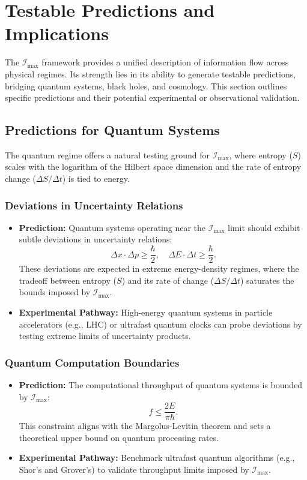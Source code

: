 \documentclass[12pt]{article}
\begin{document}
\section{Testable Predictions and Implications}
The \( \mathcal{I}_{\text{max}} \) framework provides a unified description of information flow across physical regimes. Its strength lies in its ability to generate testable predictions, bridging quantum systems, black holes, and cosmology. This section outlines specific predictions and their potential experimental or observational validation.

\subsection{Predictions for Quantum Systems}
The quantum regime offers a natural testing ground for \( \mathcal{I}_{\text{max}} \), where entropy (\( S \)) scales with the logarithm of the Hilbert space dimension and the rate of entropy change (\( \Delta S / \Delta t \)) is tied to energy.

\subsubsection{Deviations in Uncertainty Relations}
\begin{itemize}
    \item \textbf{Prediction:} Quantum systems operating near the \( \mathcal{I}_{\text{max}} \) limit should exhibit subtle deviations in uncertainty relations:
    \[
    \Delta x \cdot \Delta p \geq \frac{\hbar}{2}, \quad \Delta E \cdot \Delta t \geq \frac{\hbar}{2}.
    \]
    These deviations are expected in extreme energy-density regimes, where the tradeoff between entropy (\( S \)) and its rate of change (\( \Delta S / \Delta t \)) saturates the bounds imposed by \( \mathcal{I}_{\text{max}} \).

    \item \textbf{Experimental Pathway:} High-energy quantum systems in particle accelerators (e.g., LHC) or ultrafast quantum clocks can probe deviations by testing extreme limits of uncertainty products.
\end{itemize}

\subsubsection{Quantum Computation Boundaries}
\begin{itemize}
    \item \textbf{Prediction:} The computational throughput of quantum systems is bounded by \( \mathcal{I}_{\text{max}} \):
    \[
    f \leq \frac{2E}{\pi \hbar}.
    \]
    This constraint aligns with the Margolus-Levitin theorem and sets a theoretical upper bound on quantum processing rates.

    \item \textbf{Experimental Pathway:} Benchmark ultrafast quantum algorithms (e.g., Shor’s and Grover’s) to validate throughput limits imposed by \( \mathcal{I}_{\text{max}} \).
\end{itemize}
\end{document}
